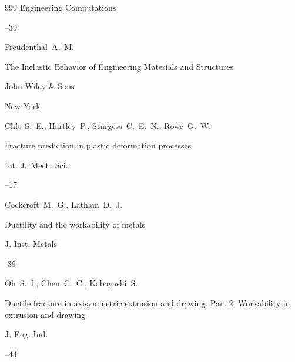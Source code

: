 \begin{thebibliography}{999}
\jour Engineering Computations




--39






\by Freudenthal~A.~M. 

\book The Inelastic Behavior of Engineering Materials and Structures

\publ John Wiley \& Sons

\publaddr New York





\by Clift~S.~E., Hartley~P., Sturgess~C.~E.~N., Rowe~G.~W. 

\paper Fracture prediction in plastic deformation processes

\jour Int. J.~Mech. Sci.




–17





\by Cockcroft~M.~G., Latham~D.~J. 

\paper Ductility and the workability of metals

\jour J. Inst. Metals



-39




\by Oh~S.~I., Chen~C.~C., Kobayashi~S. 

\paper Ductile fracture in axisymmetric extrusion and drawing. Part 2. Workability in extrusion and drawing

\jour J. Eng. Ind. 




–44


\end{thebibliography}
